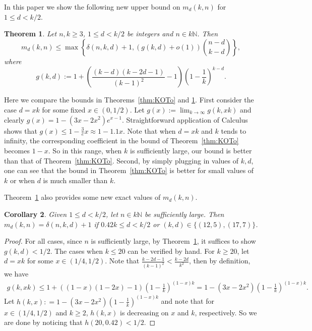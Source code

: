 \documentclass{amsart}
\newtheorem{theorem}{Theorem}
\theoremstyle{plain}
\newtheorem{corollary}[theorem]{Corollary}
\numberwithin{equation}{section}
\numberwithin{theorem}{section}
\numberwithin{case}{section}
\numberwithin{subcase}{case}
\begin{document}
In this paper we show the following new upper bound on $m_d(k,n)$ for $1\le d<k/2$.

\begin{theorem}\label{thm:int_mat}
Let $n, k\ge 3$, $1\le d< k/2$ be integers and $n\in k\mathbb{N}$. Then
\begin{equation*}
m_d(k,n) \le \max\left\{\delta(n,k,d)+1, \left(g(k,d) + o(1) \right) \binom{n-d}{k-d}\right\},
\end{equation*}
where
\[
g(k,d) := 1+ \left( \frac{(k-d)(k-2d-1)}{(k-1)^2}-1 \right) \left( 1-\frac{1}{k} \right)^{k-d}.
\]
\end{theorem}

Here we compare the bounds in Theorems~\ref{thm:KOTo} and \ref{thm:int_mat}.
First consider the case $d=xk$ for some fixed $x\in (0,1/2)$.
Let $g(x) := \lim_{k\rightarrow \infty} g(k,x k)$ and clearly $g(x) = 1- \left(3x-2x^2 \right) e^{x-1}$.
Straightforward application of Calculus shows that $g(x) \le 1 - \frac{3}e x \approx 1 - 1.1x$.
Note that when $d=x k$ and $k$ tends to infinity, the corresponding coefficient in the bound of Theorem~\ref{thm:KOTo} becomes $1-x$.
So in this range, when $k$ is sufficiently large, our bound is better than that of Theorem~\ref{thm:KOTo}.
Second, by simply plugging in values of $k, d$, one can see that the bound in Theorem~\ref{thm:KOTo} is better for small values of $k$ or when $d$ is much smaller than $k$.

Theorem~\ref{thm:int_mat} also provides some new exact values of $m_d(k,n)$.

\begin{corollary}\label{cor:mdk}
Given $1\le d<k/2$, let $n\in k\mathbb{N}$ be sufficiently large. Then $m_d(k,n) =\delta(n,k,d)+1$ if $0.42k \le d < k/2$ or $(k,d)\in \{(12,5), (17,7)\}$.
\end{corollary}

\begin{proof}
For all cases, since $n$ is sufficiently large, by Theorem~\ref{thm:int_mat}, it suffices to show $g(k, d)<1/2$.
The cases when $k\le 20$ can be verified by hand.
For $k\ge 20$, let $d=x k$ for some $x\in (1/4,1/2)$. 
Note that $\frac{k-2d-1}{(k-1)^2}< \frac{k-2d}{k^2}$, then by definition, we have
\begin{align*}
g(k, x k) \le 1+ \left((1-x)(1-2x)-1 \right) \left( 1-\frac{1}{k} \right)^{(1-x)k} = 1- \left(3x-2x^2 \right) \left( 1-\frac{1}{k} \right)^{(1-x)k}.
\end{align*}
Let $h(k, x): = 1- \left(3x-2x^2 \right) \left( 1-\frac{1}{k} \right)^{(1-x)k}$ and note that for $x\in (1/4, 1/2)$ and $k\ge 2$, $h(k,x)$ is decreasing on $x$ and $k$, respectively.
So we are done by noticing that $h(20, 0.42)<1/2$.
\end{proof}
\end{document}

